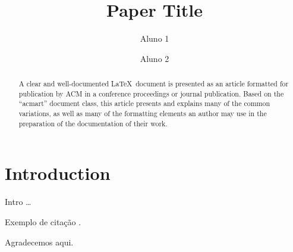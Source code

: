 \documentclass[sigconf,nonacm]{acmart}
\begin{document}
\title{Paper Title}

\author{Aluno 1}

\author{Aluno 2}


\begin{abstract}
  A clear and well-documented \LaTeX\ document is presented as an
  article formatted for publication by ACM in a conference proceedings
  or journal publication. Based on the ``acmart'' document class, this
  article presents and explains many of the common variations, as well
  as many of the formatting elements an author may use in the
  preparation of the documentation of their work.
\end{abstract}


%


\maketitle

\section{Introduction}

Intro \dots


Exemplo de citação \cite{Abril07}.


\begin{acks}
Agradecemos aqui.
\end{acks}



\end{document}
